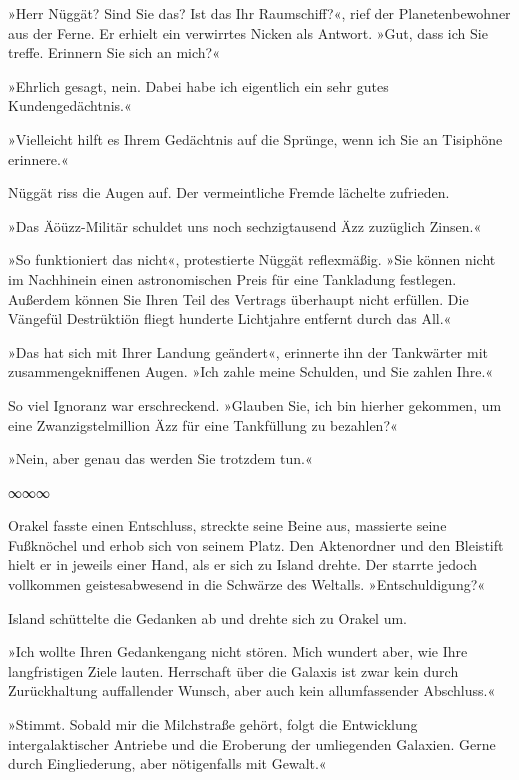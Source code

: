 »Herr Nüggät? Sind Sie das? Ist das Ihr Raumschiff?«, rief der Planetenbewohner aus der Ferne. Er erhielt ein verwirrtes Nicken als Antwort. »Gut, dass ich Sie treffe. Erinnern Sie sich an mich?«

»Ehrlich gesagt, nein. Dabei habe ich eigentlich ein sehr gutes Kundengedächtnis.«

»Vielleicht hilft es Ihrem Gedächtnis auf die Sprünge, wenn ich Sie an Tisiphöne erinnere.«

Nüggät riss die Augen auf. Der vermeintliche Fremde lächelte zufrieden.

»Das Äöüzz-Militär schuldet uns noch sechzigtausend Äzz zuzüglich Zinsen.«

»So funktioniert das nicht«, protestierte Nüggät reflexmäßig. »Sie können nicht im Nachhinein einen astronomischen Preis für eine Tankladung festlegen. Außerdem können Sie Ihren Teil des Vertrags überhaupt nicht erfüllen. Die Vängefül Destrüktiön fliegt hunderte Lichtjahre entfernt durch das All.«

»Das hat sich mit Ihrer Landung geändert«, erinnerte ihn der Tankwärter mit zusammengekniffenen Augen. »Ich zahle meine Schulden, und Sie zahlen Ihre.«

So viel Ignoranz war erschreckend. »Glauben Sie, ich bin hierher gekommen, um eine Zwanzigstelmillion Äzz für eine Tankfüllung zu bezahlen?«

»Nein, aber genau das werden Sie trotzdem tun.«

\begin{center}
∞∞∞
\end{center}

Orakel fasste einen Entschluss, streckte seine Beine aus, massierte seine Fußknöchel und erhob sich von seinem Platz. Den Aktenordner und den Bleistift hielt er in jeweils einer Hand, als er sich zu Island drehte. Der starrte jedoch vollkommen geistesabwesend in die Schwärze des Weltalls. »Entschuldigung?«

Island schüttelte die Gedanken ab und drehte sich zu Orakel um.

»Ich wollte Ihren Gedankengang nicht stören. Mich wundert aber, wie Ihre langfristigen Ziele lauten. Herrschaft über die Galaxis ist zwar kein durch Zurückhaltung auffallender Wunsch, aber auch kein allumfassender Abschluss.«

»Stimmt. Sobald mir die Milchstraße gehört, folgt die Entwicklung intergalaktischer Antriebe und die Eroberung der umliegenden Galaxien. Gerne durch Eingliederung, aber nötigenfalls mit Gewalt.«

